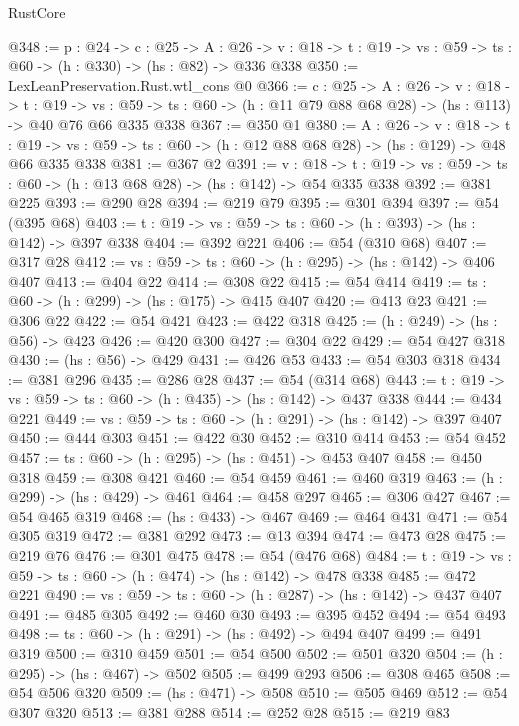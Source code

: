 \begin{lexlean}{RustCore}
\begin{coremodule}
@348 := {p : @24} ->
  {c : @25} ->
  {A : @26} ->
  {v : @18} -> {t : @19} -> {vs : @59} -> {ts : @60} -> (h : @330) -> (hs : @82) -> @336 @338
@350 := LexLeanPreservation.Rust.wtl_cons @0
@366 := {c : @25} ->
  {A : @26} ->
  {v : @18} ->
  {t : @19} ->
  {vs : @59} -> {ts : @60} -> (h : @11 @79 @88 @68 @28) -> (hs : @113) -> @40 @76 @66 @335 @338
@367 := @350 @1
@380 := {A : @26} ->
  {v : @18} ->
  {t : @19} -> {vs : @59} -> {ts : @60} -> (h : @12 @88 @68 @28) -> (hs : @129) -> @48 @66 @335 @338
@381 := @367 @2
@391 := {v : @18} ->
  {t : @19} -> {vs : @59} -> {ts : @60} -> (h : @13 @68 @28) -> (hs : @142) -> @54 @335 @338
@392 := @381 @225
@393 := @290 @28
@394 := @219 @79
@395 := @301 @394
@397 := @54 (@395 @68)
@403 := {t : @19} -> {vs : @59} -> {ts : @60} -> (h : @393) -> (hs : @142) -> @397 @338
@404 := @392 @221
@406 := @54 (@310 @68)
@407 := @317 @28
@412 := {vs : @59} -> {ts : @60} -> (h : @295) -> (hs : @142) -> @406 @407
@413 := @404 @22
@414 := @308 @22
@415 := @54 @414
@419 := {ts : @60} -> (h : @299) -> (hs : @175) -> @415 @407
@420 := @413 @23
@421 := @306 @22
@422 := @54 @421
@423 := @422 @318
@425 := (h : @249) -> (hs : @56) -> @423
@426 := @420 @300
@427 := @304 @22
@429 := @54 @427 @318
@430 := (hs : @56) -> @429
@431 := @426 @53
@433 := @54 @303 @318
@434 := @381 @296
@435 := @286 @28
@437 := @54 (@314 @68)
@443 := {t : @19} -> {vs : @59} -> {ts : @60} -> (h : @435) -> (hs : @142) -> @437 @338
@444 := @434 @221
@449 := {vs : @59} -> {ts : @60} -> (h : @291) -> (hs : @142) -> @397 @407
@450 := @444 @303
@451 := @422 @30
@452 := @310 @414
@453 := @54 @452
@457 := {ts : @60} -> (h : @295) -> (hs : @451) -> @453 @407
@458 := @450 @318
@459 := @308 @421
@460 := @54 @459
@461 := @460 @319
@463 := (h : @299) -> (hs : @429) -> @461
@464 := @458 @297
@465 := @306 @427
@467 := @54 @465 @319
@468 := (hs : @433) -> @467
@469 := @464 @431
@471 := @54 @305 @319
@472 := @381 @292
@473 := @13 @394
@474 := @473 @28
@475 := @219 @76
@476 := @301 @475
@478 := @54 (@476 @68)
@484 := {t : @19} -> {vs : @59} -> {ts : @60} -> (h : @474) -> (hs : @142) -> @478 @338
@485 := @472 @221
@490 := {vs : @59} -> {ts : @60} -> (h : @287) -> (hs : @142) -> @437 @407
@491 := @485 @305
@492 := @460 @30
@493 := @395 @452
@494 := @54 @493
@498 := {ts : @60} -> (h : @291) -> (hs : @492) -> @494 @407
@499 := @491 @319
@500 := @310 @459
@501 := @54 @500
@502 := @501 @320
@504 := (h : @295) -> (hs : @467) -> @502
@505 := @499 @293
@506 := @308 @465
@508 := @54 @506 @320
@509 := (hs : @471) -> @508
@510 := @505 @469
@512 := @54 @307 @320
@513 := @381 @288
@514 := @252 @28
@515 := @219 @83

\end{coremodule}
\end{lexlean}

